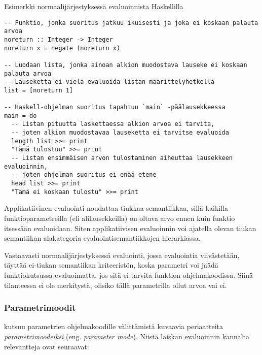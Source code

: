 \begin{listing}[H]
  \caption{Esimerkki normaalijärjestyksessä evaluoinnista Haskellilla}
  \label{codehaskellnormalorder}
  \bigskip
  \begin{verbatim}
-- Funktio, jonka suoritus jatkuu ikuisesti ja joka ei koskaan palauta arvoa
noreturn :: Integer -> Integer
noreturn x = negate (noreturn x)

-- Luodaan lista, jonka ainoan alkion muodostava lauseke ei koskaan palauta arvoa
-- Lauseketta ei vielä evaluoida listan määrittelyhetkellä
list = [noreturn 1]

-- Haskell-ohjelman suoritus tapahtuu `main` -päälausekkeessa
main = do
  -- Listan pituutta laskettaessa alkion arvoa ei tarvita,
  -- joten alkion muodostavaa lauseketta ei tarvitse evaluoida
  length list >>= print
  "Tämä tulostuu" >>= print
  -- Listan ensimmäisen arvon tulostaminen aiheuttaa lausekkeen evaluoinnin,
  -- joten ohjelman suoritus ei enää etene
  head list >>= print
  "Tämä ei koskaan tulostu" >>= print

  \end{verbatim}
\end{listing}

Applikatiivinen evaluointi noudattaa tiukkaa semantiikkaa, sillä kaikilla funktioparametreilla (eli alilausekkeilla) on oltava arvo ennen kuin funktio itsessään evaluoidaan. Siten applikatiivisen evaluoinnin voi ajatella olevan tiukan semantiikan alakategoria evaluointisemantiikkojen hierarkiassa.

Vastaavasti normaalijärjestyksessä evaluointi, jossa evaluointia viivästetään, täyttää ei-tiukan semantiikan kriteeristön, koska parametri voi jäädä funktiokutsussa evaluoimatta, jos sitä ei tarvita funktion ohjelmakoodissa. Siinä tilanteessa ei ole merkitystä, olisiko tällä parametrilla ollut arvoa vai ei.

\subsubsection{Parametrimoodit}

\citep{scott2009programming} kutsuu parametrien ohjelmakoodille välittämistä kuvaavia periaatteita \textit{parametrimoodeiksi} (eng. \textit{parameter mode}). Niistä laiskan evaluoinnin kannalta relevantteja ovat seuraavat:

